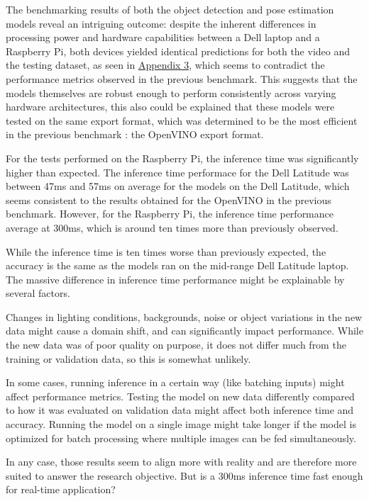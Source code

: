 \documentclass[12pt]{article}
\begin{document}
The benchmarking results of both the object detection and pose estimation models reveal an intriguing outcome: despite the inherent differences in processing power and hardware capabilities between a Dell laptop and a Raspberry Pi, both devices yielded identical predictions for both the video and the testing dataset, as seen in \hyperref[sec:accuracy]{Appendix 3}, which seems to contradict the performance metrics observed in the previous benchmark. This suggests that the models themselves are robust enough to perform consistently across varying hardware architectures, this also could be explained that these models were tested on the same export format, which was determined to be the most efficient in the previous benchmark : the OpenVINO export format.

For the tests performed on the Raspberry Pi, the inference time was significantly higher than expected. The inference time performace for the Dell Latitude was between 47ms and 57ms on average for the models on the Dell Latitude, which seems consistent to the results obtained for the OpenVINO in the previous benchmark. However, for the Raspberry Pi, the inference time performance average at 300ms, which is around ten times more than previously observed.

While the inference time is ten times worse than previously expected, the accuracy is the same as the models ran on the mid-range Dell Latitude laptop. The massive difference in inference time performance might be explainable by several factors.

Changes in lighting conditions, backgrounds, noise or object variations in the new data might cause a domain shift, and  can significantly impact performance. While the new data was of poor quality on purpose, it does not differ much from the training or validation data, so this is somewhat unlikely.

In some cases, running inference in a certain way (like batching inputs) might affect performance metrics. Testing the model on new data differently compared to how it was evaluated on validation data might affect both inference time and accuracy. Running the model on a single image might take longer if the model is optimized for batch processing where multiple images can be fed simultaneously.

In any case, those results seem to align more with reality and are therefore more suited to answer the research objective. But is a 300ms inference time fast enough for real-time application?
\end{document}
